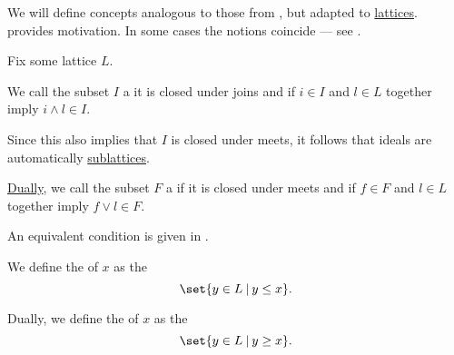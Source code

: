 \begin{definition}\label{def:lattice_ideal}
  We will define concepts analogous to those from , but adapted to \hyperref[def:semilattice/lattice]{lattices}.  provides motivation. In some cases the notions coincide --- see .

  Fix some lattice \( L \).

  \begin{thmenum}
    \begin{minipage}[t]{0.45\textwidth}
      We call the subset \( I \) a  it is closed under joins and if \( i \in I \) and \( l \in L \) together imply \( i \wedge l \in I \).

      Since this also implies that \( I \) is closed under meets, it follows that ideals are automatically \hyperref[def:semilattice/submodel]{sublattices}.
    \end{minipage}
    \hspace{0.02\textwidth}
    \begin{minipage}[t]{0.45\textwidth}
      \hyperref[def:partially_ordered_set/duality]{Dually}, we call the subset \( F \) a  if it is closed under meets and if \( f \in F \) and \( l \in L \) together imply \( f \vee l \in F \).

      An equivalent condition is given in .
    \end{minipage}

    \begin{minipage}[t]{0.45\textwidth}
      We define the  of \( x \) as the 
      \begin{equation*}
        \set{ y \in L \given y \leq x }.
      \end{equation*}
    \end{minipage}
    \hspace{0.02\textwidth}
    \begin{minipage}[t]{0.45\textwidth}
      Dually, we define the  of \( x \) as the 
      \begin{equation*}
        \set{ y \in L \given y \geq x }.
      \end{equation*}
    \end{minipage}


\end{thmenum}
\end{definition}
